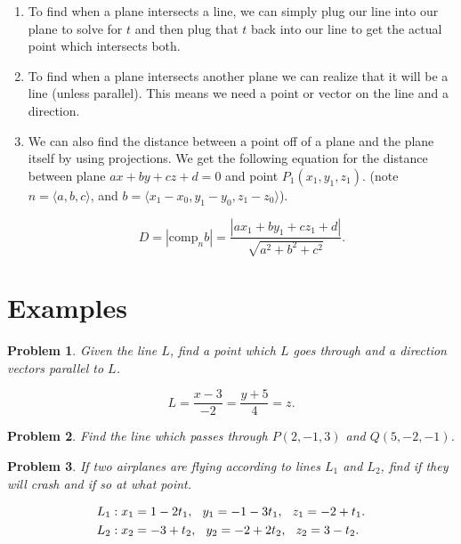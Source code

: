 \documentclass[11pt]{article}
\newtheorem{problem}{Problem}
\begin{document}
\begin{enumerate}
\item To find when a plane intersects a line, we can simply plug our line into our plane to solve for $t$ and then plug that $t$ back into our line to get the actual point which intersects both.

\item To find when a plane intersects another plane we can realize that it will be a line (unless parallel). This means we need a point or vector on the line and a direction. 

\item We can also find the distance between a point off of a plane and the plane itself by using projections. We get the following equation for the distance between plane $ax+by+cz+d=0$ and point $P_1(x_1,y_1,z_1)$. (note $n = \langle a,b,c \rangle$, and $b = \langle x_1-x_0,y_1-y_0,z_1-z_0 \rangle$).

\begin{equation*}
    D = |\text{comp}_nb| = \frac{|ax_1+by_1+cz_1+d|}{\sqrt{a^2+b^2+c^2}}.
\end{equation*}
\end{enumerate}



\section{Examples}

\begin{problem}
    Given the line $L$, find a point which $L$ goes through and a direction vectors parallel to $L$.

    \begin{equation*}
        L = \frac{x-3}{-2} = \frac{y+5}{4} = z.
    \end{equation*}
\end{problem}

\vspace{2cm}

\begin{problem}
    Find the line which passes through $P(2, -1, 3)$ and $Q(5,-2,-1)$.
\end{problem}

\vspace{4cm}

\begin{problem}
If two airplanes are flying according to lines $L_1$ and $L_2$, find if they will crash and if so at what point.

\begin{align*}
    &L_1: x_1 = 1-2t_1, \hspace{.25cm} y_1 = -1-3t_1, \hspace{.25cm} z_1 = -2+t_1.\\
    &L_2: x_2 = -3+t_2, \hspace{.25cm} y_2 = -2+2t_2, \hspace{.25cm} z_2 = 3-
    t_2.
\end{align*}
\end{problem}
\end{document}
